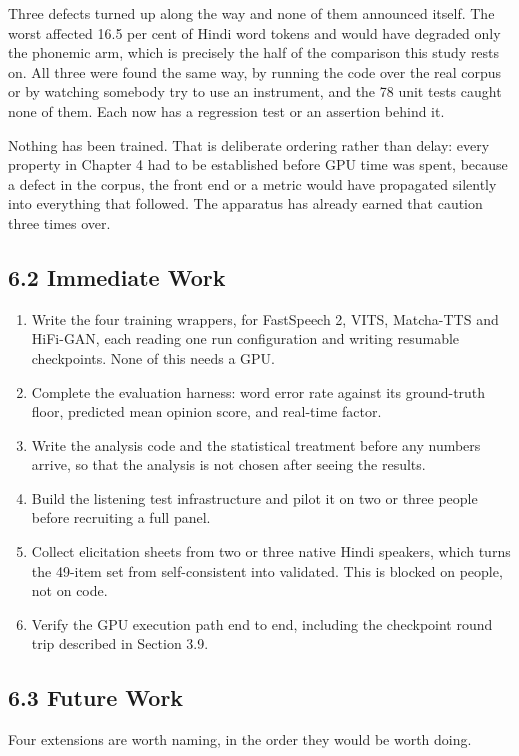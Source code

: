 \documentclass[12pt,a4paper]{article}
\begin{document}
Three defects turned up along the way and none of them announced itself. The worst affected 16.5 per cent of Hindi word tokens and would have degraded only the phonemic arm, which is precisely the half of the comparison this study rests on. All three were found the same way, by running the code over the real corpus or by watching somebody try to use an instrument, and the 78 unit tests caught none of them. Each now has a regression test or an assertion behind it.

Nothing has been trained. That is deliberate ordering rather than delay: every property in Chapter 4 had to be established before GPU time was spent, because a defect in the corpus, the front end or a metric would have propagated silently into everything that followed. The apparatus has already earned that caution three times over.

\subsection*{6.2  Immediate Work}
\begin{enumerate}[leftmargin=1.9em,itemsep=2pt,topsep=3pt]
  \item Write the four training wrappers, for FastSpeech 2, VITS, Matcha-TTS and HiFi-GAN, each reading one run configuration and writing resumable checkpoints. None of this needs a GPU.
  \item Complete the evaluation harness: word error rate against its ground-truth floor, predicted mean opinion score, and real-time factor.
  \item Write the analysis code and the statistical treatment before any numbers arrive, so that the analysis is not chosen after seeing the results.
  \item Build the listening test infrastructure and pilot it on two or three people before recruiting a full panel.
  \item Collect elicitation sheets from two or three native Hindi speakers, which turns the 49-item set from self-consistent into validated. This is blocked on people, not on code.
  \item Verify the GPU execution path end to end, including the checkpoint round trip described in Section 3.9.
\end{enumerate}

\subsection*{6.3  Future Work}
Four extensions are worth naming, in the order they would be worth doing.
\end{document}
